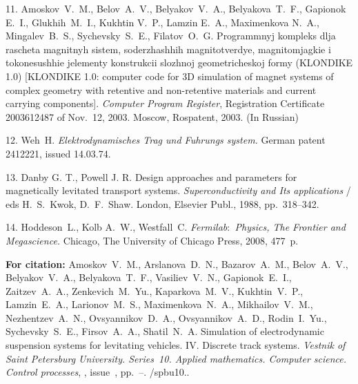 {11. Amoskov~V.~M., Belov~A.~V., Belyakov~V.~A., Belyakova~T.~F.,
Gapionok E.~I., Glukhih~M.~I., Kukhtin V.~P., Lamzin E.~A.,
Maximenkova N.~A., Mingalev~B.~S., Sychevsky~S.~E., Filatov~O.~G.
Programmnyj kompleks dlja rascheta magnitnyh sistem, soderzhashhih
magnitotverdye, magnitomjagkie i tokonesushhie jelementy
konstrukcii slozhnoj geometricheskoj formy (KLONDIKE 1.0)
[KLONDIKE 1.0: computer code for 3D simulation of magnet systems
of complex geometry with retentive and non-retentive materials and
current carrying components]. {\em Computer Program Register},
Registration Certificate 2003612487 of Nov.~12, 2003. Moscow,
Rospatent, 2003. (In Russian)

12. Weh~H. {\em Elektrodynamisches Trag und Fuhrungs system.}
German patent 2412221, issued 14.03.74.

13. Danby G. T., Powell J. R. Design approaches and parameters for
magnetically levitated transport systems. {\em Superconductivity
and Its applications} / eds H.~S.~Kwok, D.~F.~Shaw. London,
Elsevier Publ., 1988, pp.~318--342.

14. Hoddeson~L., Kolb A.~W., Westfall~C. {\em Fermilab$:$ Physics,
The Frontier and Megascience.} Chicago, The University of Chicago
Press, 2008, 477~p.

\vskip 2mm

{\bf For citation:} Amoskov~V.~M., Arslanova~D.~N., Bazarov~A.~M.,
Belov~A.~V., Belyakov~V.~A., Belyakova~T.~F., Vasiliev~V.~N.,
Gapionok~E.~I., Zaitzev~A.~A., Zenkevich~M.~Yu., Kaparkova~M.~V.,
Kukhtin~V.~P., Lamzin~E.~A., Larionov~M.~S., Maximenkova~N.~A.,
Mikhailov~V.~M., Nezhentzev~A.~N., Ovsyannikov~D.~A.,
Ovsyannikov~A.~D., Rodin~I.~Yu., Sychevsky~S.~E., Firsov~A.~A.,
Shatil~N.~A. Simulation of electrodynamic suspension systems for
levitating vehicles. IV. Discrete track systems. {\it Vestnik of
Saint Petersburg University. Series~10. Applied mathematics.
Computer science. Control processes}, \issueyear, issue~\issuenum,
pp.~\pageref{p1}--\pageref{p1e}.
\doivyp/spbu10.\issueyear.


}
